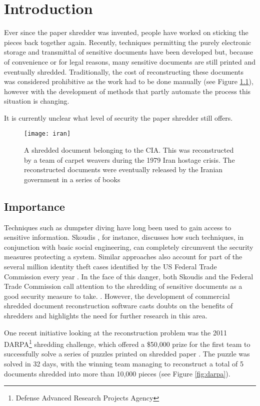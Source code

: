 \chapter{Introduction}
\label{chap1}
Ever since the paper shredder was invented, people have worked on sticking the pieces back together again. Recently, techniques permitting the purely electronic storage and transmittal of sensitive documents have been developed but, because of convenience or for legal reasons, many sensitive documents are still printed and eventually shredded. Traditionally, the cost of reconstructing these documents was considered prohibitive as the work had to be done manually (see Figure \ref{fig:iranDoc}), however with the development of methods that partly automate the process this situation is changing. 

It is currently unclear what level of security the paper shredder still offers.

\begin{figure}[h]
    \centering
    \texttt{[image: iran]}
    \caption{A shredded document belonging to the CIA. This was reconstructed by a team of carpet weavers during the 1979 Iran hostage crisis. The reconstructed documents were eventually released by the Iranian government in a series of books \cite{P10}}
    \label{fig:iranDoc}
\end{figure}

\section{Importance}
Techniques such as dumpster diving have long been used to gain access to sensitive information. Skoudis \cite{P11}, for instance, discusses how such techniques, in conjunction with basic social engineering, can completely circumvent the security measures protecting a system. Similar approaches also account for part of the several million identity theft cases identified by the US Federal Trade Commission every year \cite{P12}. In the face of this danger, both Skoudis and the Federal Trade Commission call attention to the shredding of sensitive documents as a good security measure to take. \cite{P11, P13}. However, the development of commercial shredded document reconstruction software \cite{P14} casts doubts on the benefits of shredders and highlights the need for further research in this area.
 
One recent initiative looking at the reconstruction problem was the 2011 DARPA\footnote{Defense Advanced Research Projects Agency} shredding challenge, which offered a \$50,000 prize for the first team to successfully solve a series of  puzzles printed on shredded paper \cite{P15}. The puzzle was solved in 32 days, with the winning team managing to reconstruct a total of 5 documents shredded into more than 10,000 pieces (see Figure \ref{fig:darpa}).

